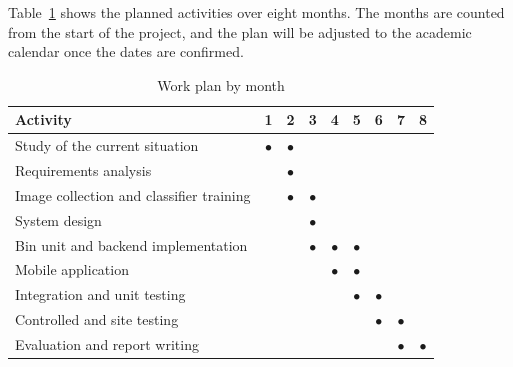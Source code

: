 \documentclass[12pt,a4paper]{report}
\begin{document}
Table~\ref{tab:plan} shows the planned activities over eight months. The months are counted from the start of the project, and the plan will be adjusted to the academic calendar once the dates are confirmed.

\begin{table}[htbp]
\centering
\small
\renewcommand{\arraystretch}{1.3}
\begin{tabular}{>{\raggedright\arraybackslash}p{6.4cm}*{8}{c}}
\hline
\textbf{Activity} & \textbf{1} & \textbf{2} & \textbf{3} & \textbf{4} & \textbf{5} & \textbf{6} & \textbf{7} & \textbf{8}\\
\hline
Study of the current situation & $\bullet$ & $\bullet$ & & & & & &\\
Requirements analysis & & $\bullet$ & & & & & &\\
Image collection and classifier training & & $\bullet$ & $\bullet$ & & & & &\\
System design & & & $\bullet$ & & & & &\\
Bin unit and backend implementation & & & $\bullet$ & $\bullet$ & $\bullet$ & & &\\
Mobile application & & & & $\bullet$ & $\bullet$ & & &\\
Integration and unit testing & & & & & $\bullet$ & $\bullet$ & &\\
Controlled and site testing & & & & & & $\bullet$ & $\bullet$ &\\
Evaluation and report writing & & & & & & & $\bullet$ & $\bullet$\\
\hline
\end{tabular}
\caption{Work plan by month}
\label{tab:plan}
\end{table}



\end{document}
